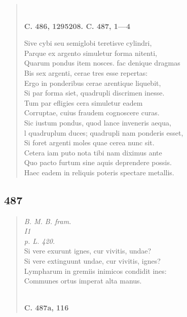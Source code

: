\documentclass[11pt, a4paper]{report}
\begin{document}
\begin{verse}
        ﻿\pagebreak 
    \begin{center} \textbf{C. 486, 1295208. C. 487, 1—4} \end{center} \marginpar{[4]} Sive cybi seu semiglobi teretisve cylindri, \\ Parque ex argento simuletur forma nitenti, \\ Quarum pondus item nosces. fac denique dragmas \\ Bis sex argenti, cerae tres esse repertas: \\ Ergo in ponderibus cerae arentique liquebit, \\ Si par forma siet, quadrupli discrimen inesse. \\ Tum par efligies cera simuletur eadem \\ Corruptae, cuius fraudem cognoscere curas. \\ Sic iustum pondus, quod lance inveneris aequa, \\ l quadruplum duces; quadrupli nam ponderis esset, \\ Si foret argenti moles quae cerea nunc sit. \\ Cetera iam puto nota tibi nam diximus ante \\ Quo pacto furtum sine aquis deprendere possis. \\ Haec eadem in reliquis poteris spectare metallis. \\ 
      \end{verse}
  
            \subsection*{487}
      \begin{verse}
      \textit{B. M. B. fram.} \\ \textit{I1} \\ \textit{p. L. 420.} \\ Si vere exurunt ignes, cur vivitis, undae? \\ Si vere extinguunt undae, cur vivitis, ignes? \\ Lympharum in gremiis inimicos condidit ines: \\ Communes ortus imperat alta manus. \\ 
        ﻿\pagebreak 
    \begin{center} \textbf{C. 487a, 116} \end{center} \marginpar{[38]} 
      \end{verse}
  
\end{document}

